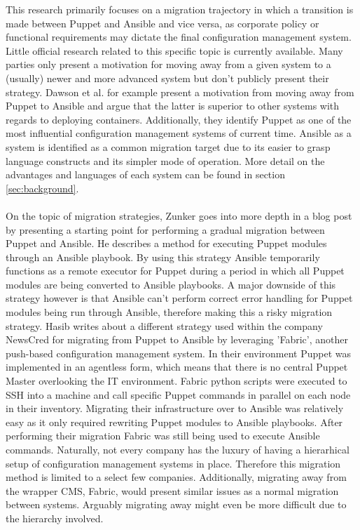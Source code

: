 This research primarily focuses on a migration trajectory in which a transition is made between Puppet and Ansible and vice versa, as corporate policy or functional requirements may dictate the final configuration management system. Little official research related to this specific topic is currently available. Many parties only present a motivation for moving away from a given system to a (usually) newer and more advanced system but don't publicly present their strategy. Dawson et al. \cite{dawson_hall_hecht_2014} for example present a motivation from moving away from Puppet to Ansible and argue that the latter is superior to other systems with regards to deploying containers. Additionally, they identify Puppet as one of the most influential configuration management systems of current time. Ansible as a system is identified as a common migration target due to its easier to grasp language constructs and its simpler mode of operation. More detail on the advantages and languages of each system can be found in section \ref{sec:background}. 
\\\\
On the topic of migration strategies, Zunker \cite{zunker_2014} goes into more depth in a blog post by presenting a starting point for performing a gradual migration between Puppet and Ansible. He describes a method for executing Puppet modules through an Ansible playbook. By using this strategy Ansible temporarily functions as a remote executor for Puppet during a period in which all Puppet modules are being converted to Ansible playbooks. A major downside of this strategy however is that Ansible can't perform correct error handling for Puppet modules being run through Ansible, therefore making this a risky migration strategy. Hasib \cite{hasib_2015} writes about a different strategy used within the company NewsCred for migrating from Puppet to Ansible by leveraging 'Fabric', another push-based configuration management system. In their environment Puppet was implemented in an agentless form, which means that there is no central Puppet Master overlooking the IT environment. Fabric python scripts were executed to SSH into a machine and call specific Puppet commands in parallel on each node in their inventory. Migrating their infrastructure over to Ansible was relatively easy as it only required rewriting Puppet modules to Ansible playbooks. After performing their migration Fabric was still being used to execute Ansible commands. Naturally, not every company has the luxury of having a hierarhical setup of configuration management systems in place. Therefore this migration method is limited to a select few companies. Additionally, migrating away from the wrapper CMS, Fabric, would present similar issues as a normal migration between systems. Arguably migrating away might even be more difficult due to the hierarchy involved. 

